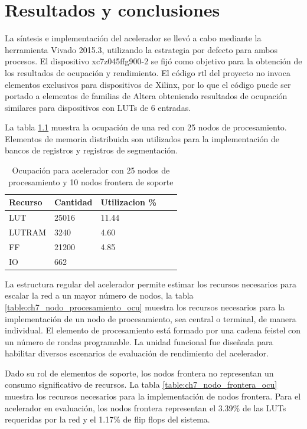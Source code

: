 \chapter{Resultados y conclusiones}
	\label{conclusiones}

La síntesis e implementación del acelerador se llevó a cabo mediante la herramienta Vivado 2015.3, utilizando la estrategia por defecto para ambos procesos. El dispositivo xc7z045ffg900-2 se fijó como objetivo para la obtención de los resultados de ocupación y rendimiento. El código rtl del proyecto no invoca elementos exclusivos para dispositivos de Xilinx, por lo que el código puede ser portado a elementos de familias de Altera obteniendo resultados de ocupación similares para dispositivos con LUTs de 6 entradas.

La tabla \ref{table:ch7_network_core_ocu} muestra la ocupación de una red con 25 nodos de procesamiento. Elementos de memoria distribuida son utilizados para la implementación de bancos de registros y registros de segmentación.

\begin{table}[]
	\centering
		\begin{tabular}{lllll}
			Recurso & Cantidad & Utilizacion \% &  &  \\\hline
			LUT     & 25016    & 11.44          &  &  \\
			LUTRAM  & 3240     & 4.60           &  &  \\
			FF      & 21200    & 4.85           &  &  \\
			IO      & 662      & ~              &  & 
		\end{tabular}
	\caption{Ocupación para acelerador con 25 nodos de procesamiento y 10 nodos frontera de soporte}
	\label{table:ch7_network_core_ocu}
\end{table}

La estructura regular del acelerador permite estimar los recursos necesarios para escalar la red a un mayor número de nodos, la tabla \ref{table:ch7_nodo_procesamiento_ocu} muestra los recursos necesarios para la implementación de un nodo de procesamiento, sea central o terminal, de manera individual. El elemento de procesamiento está formado por una cadena feistel con un número de rondas programable. La unidad funcional fue diseñada para habilitar diversos escenarios de evaluación de rendimiento del acelerador. 

Dado su rol de elementos de soporte, los nodos frontera no representan un consumo significativo de recursos. La tabla \ref{table:ch7_nodo_frontera_ocu} muestra los recursos necesarios para la implementación de nodos frontera. Para el acelerador en evaluación, los nodos frontera representan el 3.39\% de las LUTs requeridas por la red y el 1.17\% de flip flops del sistema.

